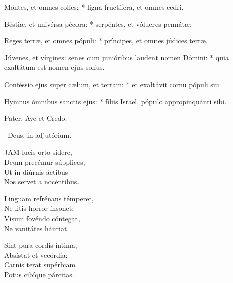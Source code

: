 Montes, et omnes colles: * ligna fructífera, et omnes cedri.

Béstiæ, et univérsa pécora: * serpéntes, et vólucres pennátæ:

Reges terræ, et omnes pópuli: * príncipes, et omnes júdices terræ.

Júvenes, et vírgines: senes cum junióribus laudent nomen Dómini: * quia exaltátum est nomen ejus solíus.

Conféssio ejus super cælum, et terram: * et exaltávit cornu pópuli sui.

Hymnus ómnibus sanctis ejus: * fíliis Israël, pópulo appropinquánti sibi.






Pater, Ave et Credo.

\V\ Deus, in adjutórium.


\lettrine[lines=2]{J}{AM} lucis orto sídere,\\
Deum precémur súpplices,\\
Ut in diúrnis áctibus\\
Nos servet a nocéntibus.

Linguam refrénans témperet,\\
Ne litis horror ínsonet:\\
Visum fovéndo cóntegat,\\
Ne vanitátes háuriat.

Sint pura cordis íntima,\\
Absístat et vecórdia:\\
Carnis terat supérbiam\\
Potus cibíque párcitas.

